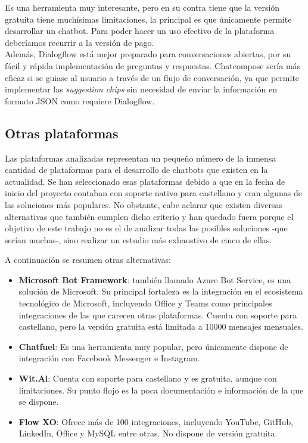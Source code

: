 Es una herramienta muy interesante, pero en su contra tiene que la versión gratuita tiene muchísimas limitaciones, la principal es que únicamente permite desarrollar un chatbot.
Para poder hacer un uso efectivo de la plataforma deberíamos recurrir a la versión de pago.\\

Además, Dialogflow está mejor preparado para conversaciones abiertas, por su fácil y rápida implementación de preguntas y respuestas. Chatcompose sería más eficaz si se guiase al usuario a través de un flujo de conversación, ya que permite implementar las \textit{suggestion chips} sin necesidad de enviar la información en formato JSON como requiere Dialogflow. 
\newpage

\subsection{Otras plataformas}

Las plataformas analizadas representan un pequeño número de la inmensa cantidad de plataformas para el desarrollo de chatbots que existen en la actualidad. Se han seleccionado esas plataformas debido a que en la fecha de inicio del proyecto contaban con soporte nativo para castellano y eran algunas de las soluciones más populares. No obstante, cabe aclarar que existen diversas alternativas que también cumplen dicho criterio y han quedado fuera porque el objetivo de este trabajo no es el de analizar todas las posibles soluciones -que serían muchas-, sino realizar un estudio más exhaustivo de cinco de ellas. 

A continuación se resumen otras alternativas:

\begin{itemize}
	\item \textbf{Microsoft Bot Framework}: también llamado Azure Bot Service, es una solución de Microsoft. Su principal fortaleza es la integración en el ecosistema tecnológico de Microsoft, incluyendo Office y Teams como principales integraciones de las que carecen otras plataformas. Cuenta con soporte para castellano, pero la versión gratuita está limitada a 10000 mensajes mensuales. \cite{MicrosoftBotFramework}
	\item \textbf{Chatfuel}: Es una herramienta muy popular, pero únicamente dispone de integración con Facebook Messenger e Instagram. \cite{ChatFuel}
	\item \textbf{Wit.Ai}: Cuenta con soporte para castellano y es gratuita, aunque con limitaciones. Su punto flojo es la poca documentación e información de la que se dispone. \cite{Wit.Ai}
	\item \textbf{Flow XO}: Ofrece más de 100 integraciones, incluyendo YouTube, GitHub, LinkedIn, Office y MySQL entre otras. No dispone de versión gratuita. \cite{FlowXO}
	
\end{itemize}


